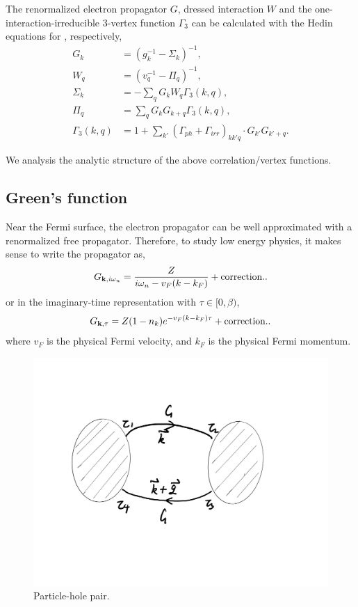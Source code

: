 \documentclass[reprint,amsmath,amssymb,aps,prb]{revtex4-1}
\begin{document}
The renormalized electron propagator $G$, dressed interaction $W$ and the one-interaction-irreducible $3$-vertex function $\Gamma_3$ can be calculated with the Hedin equations for , respectively,
\begin{align}
    G_k            & =(g^{-1}_k-\Sigma_k)^{-1},                                           \\
    W_q            & =(v_q^{-1}-\Pi_q)^{-1},                                              \\
    \Sigma_k       & =-\sum_q G_k W_q \Gamma_3(k, q),                                     \\
    \label{eq:polar}
    \Pi_q          & =\sum_q G_k G_{k+q} \Gamma_3(k, q),                                  \\
    \Gamma_3(k, q) & =1+\sum_{k'} (\Gamma_{ph}+\Gamma_{irr})_{kk'q}\cdot G_{k'} G_{k'+q}.
\end{align}

We analysis the analytic structure of the above correlation/vertex functions.

\subsection{Green's function}

Near the Fermi surface, the electron propagator can be well approximated with a renormalized free propagator. Therefore, to study low energy physics, it makes sense to write the propagator as,
\begin{equation}
    G_{\mathbf{k}, i\omega_n}=\frac{Z}{i\omega_n-v_F (k-k_F)}+\text{correction.}.
\end{equation}
or in the imaginary-time representation with $\tau \in [0, \beta)$,
\begin{equation}
    G_{\mathbf{k}, \tau}=Z(1-n_k)e^{-v_F (k-k_F)\tau}+\text{correction.}.
\end{equation}
where $v_F$ is the physical Fermi velocity, and $k_F$ is the physical Fermi momentum.

\begin{figure}
    \centering
    \label{fig:bubble}
    \includegraphics[width=0.7\linewidth]{figure/bubble.jpg}
    \vspace{-1.5cm}
    \caption{Particle-hole pair.}
\end{figure}
\end{document}
